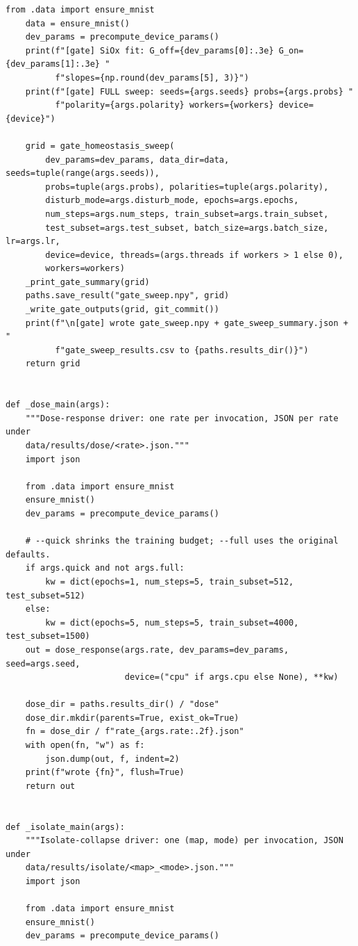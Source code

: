 \begin{lstlisting}[caption={mnn\_torch/training.py},label={lst:mnn-src-training}]
    from .data import ensure_mnist
    data = ensure_mnist()
    dev_params = precompute_device_params()
    print(f"[gate] SiOx fit: G_off={dev_params[0]:.3e} G_on={dev_params[1]:.3e} "
          f"slopes={np.round(dev_params[5], 3)}")
    print(f"[gate] FULL sweep: seeds={args.seeds} probs={args.probs} "
          f"polarity={args.polarity} workers={workers} device={device}")

    grid = gate_homeostasis_sweep(
        dev_params=dev_params, data_dir=data, seeds=tuple(range(args.seeds)),
        probs=tuple(args.probs), polarities=tuple(args.polarity),
        disturb_mode=args.disturb_mode, epochs=args.epochs,
        num_steps=args.num_steps, train_subset=args.train_subset,
        test_subset=args.test_subset, batch_size=args.batch_size, lr=args.lr,
        device=device, threads=(args.threads if workers > 1 else 0),
        workers=workers)
    _print_gate_summary(grid)
    paths.save_result("gate_sweep.npy", grid)
    _write_gate_outputs(grid, git_commit())
    print(f"\n[gate] wrote gate_sweep.npy + gate_sweep_summary.json + "
          f"gate_sweep_results.csv to {paths.results_dir()}")
    return grid


def _dose_main(args):
    """Dose-response driver: one rate per invocation, JSON per rate under
    data/results/dose/<rate>.json."""
    import json

    from .data import ensure_mnist
    ensure_mnist()
    dev_params = precompute_device_params()

    # --quick shrinks the training budget; --full uses the original defaults.
    if args.quick and not args.full:
        kw = dict(epochs=1, num_steps=5, train_subset=512, test_subset=512)
    else:
        kw = dict(epochs=5, num_steps=5, train_subset=4000, test_subset=1500)
    out = dose_response(args.rate, dev_params=dev_params, seed=args.seed,
                        device=("cpu" if args.cpu else None), **kw)

    dose_dir = paths.results_dir() / "dose"
    dose_dir.mkdir(parents=True, exist_ok=True)
    fn = dose_dir / f"rate_{args.rate:.2f}.json"
    with open(fn, "w") as f:
        json.dump(out, f, indent=2)
    print(f"wrote {fn}", flush=True)
    return out


def _isolate_main(args):
    """Isolate-collapse driver: one (map, mode) per invocation, JSON under
    data/results/isolate/<map>_<mode>.json."""
    import json

    from .data import ensure_mnist
    ensure_mnist()
    dev_params = precompute_device_params()


\end{lstlisting}
